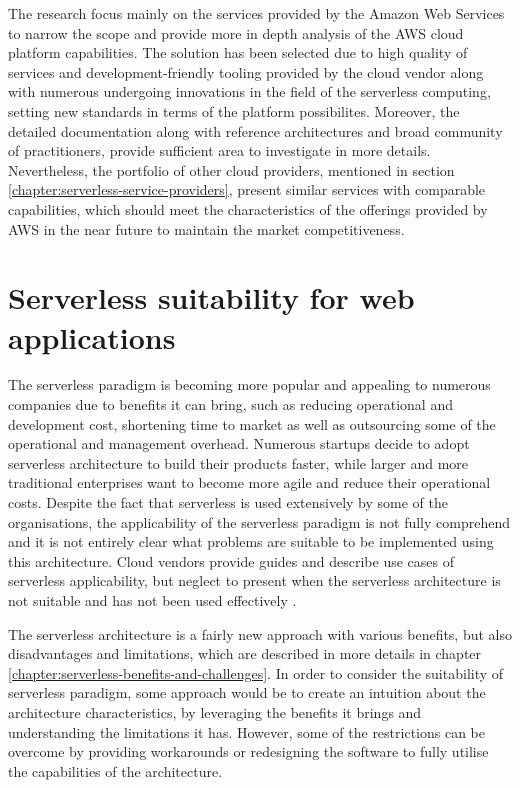 The research focus mainly on the services provided by the Amazon Web Services to narrow the scope and provide more in depth analysis of the AWS cloud platform capabilities.
The solution has been selected due to high quality of services and development-friendly tooling provided by the cloud vendor along with numerous undergoing innovations in the field of the serverless computing, setting new standards in terms of the platform possibilites.
Moreover, the detailed documentation along with reference architectures and broad community of practitioners, provide sufficient area to investigate in more details.
Nevertheless, the portfolio of other cloud providers, mentioned in section \ref{chapter:serverless-service-providers}, present similar services with comparable capabilities, which should meet the characteristics of the offerings provided by AWS in the near future to maintain the market competitiveness.

\section{Serverless suitability for web applications} \label{chapter:serverless-suitability}

The serverless paradigm is becoming more popular and appealing to numerous companies due to benefits it can bring, such as reducing operational and development cost, shortening time to market as well as outsourcing some of the operational and management overhead.
Numerous startups decide to adopt serverless architecture to build their products faster, while larger and more traditional enterprises want to become more agile and reduce their operational costs.
Despite the fact that serverless is used extensively by some of the organisations, the applicability of the serverless paradigm is not fully comprehend and it is not entirely clear what problems are suitable to be implemented using this architecture.
Cloud vendors provide guides and describe use cases of serverless applicability, but neglect to present when the serverless architecture is not suitable and has not been used effectively \cite{EvaluationOfServerlessApplicationProgrammingModel}.

The serverless architecture is a fairly new approach with various benefits, but also disadvantages and limitations, which are described in more details in chapter \ref{chapter:serverless-benefits-and-challenges}.
In order to consider the suitability of serverless paradigm, some approach would be to create an intuition about the architecture characteristics, by leveraging the benefits it brings and understanding the limitations it has.
However, some of the restrictions can be overcome by providing workarounds or redesigning the software to fully utilise the capabilities of the architecture.

